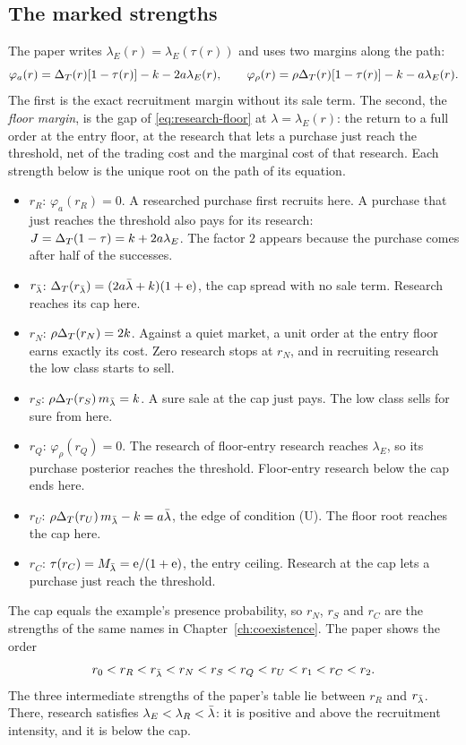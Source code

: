 \subsection{The marked strengths}

The paper writes \(\lambda_E(r)=\lambda_E(\tau(r))\) and uses two margins along the path:
\[
\varphi_a(r)=\Delta_T(r)[1-\tau(r)]-k-2a\lambda_E(r),\qquad \varphi_\rho(r)=\rho\Delta_T(r)[1-\tau(r)]-k-a\lambda_E(r).
\]
The first is the exact recruitment margin without its sale term. The second, the \emph{floor margin}, is the gap of
\eqref{eq:research-floor} at \(\lambda=\lambda_E(r)\): the return to a full order at the entry floor, at the research
that lets a purchase just reach the threshold, net of the trading cost and the marginal cost of that research. Each
strength below is the unique root on the path of its equation.
\begin{itemize}
\item \(r_R\): \(\varphi_a(r_R)=0\). A researched purchase first recruits here. A purchase that just reaches the
threshold also pays for its research: \(J=\Delta_T(1-\tau)=k+2a\lambda_E\). The factor \(2\) appears because the purchase
comes after half of the successes.
\item \(r_{\bar\lambda}\): \(\Delta_T(r_{\bar\lambda})=(2a\bar\lambda+k)(1+\mathrm{e})\), the cap spread with no sale term. Research reaches its cap here.
\item \(r_N\): \(\rho\Delta_T(r_N)=2k\). Against a quiet market, a unit order at the entry floor earns exactly its cost.
Zero research stops at \(r_N\), and in recruiting research the low class starts to sell.
\item \(r_S\): \(\rho\Delta_T(r_S)\,m_{\bar\lambda}=k\). A sure sale at the cap just pays. The low class sells for sure from here.
\item \(r_Q\): \(\varphi_\rho(r_Q)=0\). The research of floor-entry research reaches \(\lambda_E\), so its purchase
posterior reaches the threshold. Floor-entry research below the cap ends here.
\item \(r_U\): \(\rho\Delta_T(r_U)\,m_{\bar\lambda}-k=a\bar\lambda\), the edge of condition (U). The floor root reaches the cap here.
\item \(r_C\): \(\tau(r_C)=M_{\bar\lambda}=\mathrm{e}/(1+\mathrm{e})\), the entry ceiling. Research at the cap lets a purchase just reach
the threshold.
\end{itemize}
The cap equals the example's presence probability, so \(r_N\), \(r_S\) and \(r_C\) are the strengths of the same names
in Chapter~\ref{ch:coexistence}. The paper shows the order
\[
r_0<r_R<r_{\bar\lambda}<r_N<r_S<r_Q<r_U<r_1<r_C<r_2 .
\]
The three intermediate strengths of the paper's table lie between \(r_R\) and \(r_{\bar\lambda}\). There, research satisfies
\(\lambda_E<\lambda_R<\bar\lambda\): it is positive and above the recruitment intensity, and it is below the cap.

